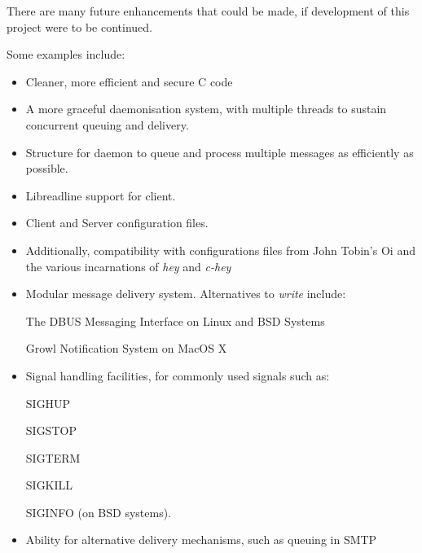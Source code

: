 There are many future enhancements that could be made, if development of
this project were to be continued.

Some examples include:

\begin{itemize}

\item Cleaner, more efficient and secure C code

\item A more graceful daemonisation system, with multiple threads to
sustain concurrent queuing and delivery.

\item Structure for daemon to queue and process multiple messages as
efficiently as possible. 

\item Libreadline support for client.

\item Client and Server configuration files.

	\item Additionally, compatibility with configurations files from John
	Tobin's Oi and the various incarnations of \emph{hey} and 
	\emph{c-hey}

\item Modular message delivery system. Alternatives to \emph{write} 
include:

	\subitem The DBUS Messaging Interface on Linux and BSD Systems

	\subitem Growl Notification System on MacOS X

\item Signal handling facilities, for commonly used signals such as:
	
	\subitem SIGHUP 
	
	\subitem SIGSTOP

	\subitem SIGTERM

	\subitem SIGKILL 

	\subitem SIGINFO (on BSD systems).

\item Ability for alternative delivery mechanisms, such as queuing in
SMTP

\end{itemize}
